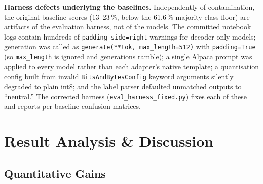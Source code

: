 \documentclass[a4paper]{article}
\begin{document}
\textbf{Harness defects underlying the baselines.} Independently of contamination, the original baseline scores (13--23\,\%, below the 61.6\,\% majority-class floor) are artifacts of the evaluation harness, not of the models. The committed notebook logs contain hundreds of \texttt{padding\_side=right} warnings for decoder-only models; generation was called as \texttt{generate(**tok, max\_length=512)} with \texttt{padding=True} (so \texttt{max\_length} is ignored and generations ramble); a single Alpaca prompt was applied to every model rather than each adapter's native template; a quantisation config built from invalid \texttt{BitsAndBytesConfig} keyword arguments silently degraded to plain int8; and the label parser defaulted unmatched outputs to ``neutral.'' The corrected harness (\texttt{eval\_harness\_fixed.py}) fixes each of these and reports per-baseline confusion matrices.

\section{Result Analysis \& Discussion}

\subsection{Quantitative Gains}
\end{document}
